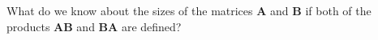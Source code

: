 
%
%
%

	What do we know about the sizes of the matrices $\mathbf{A}$ and $\mathbf{B}$ if both of the products $\mathbf{AB}$ and $\mathbf{BA}$ are defined?

\solution
	
